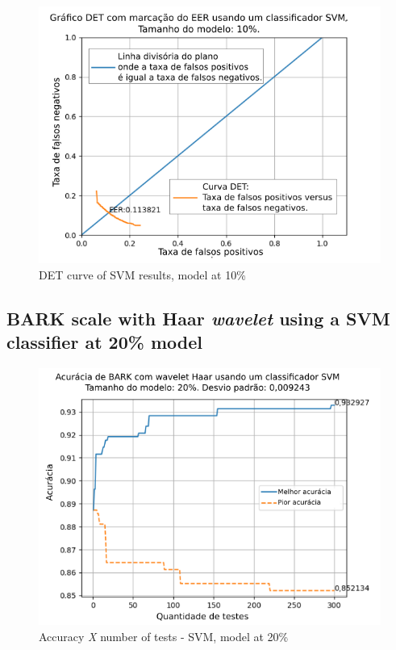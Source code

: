 \begin{figure}[H]
	\centering
	\includegraphics[width=.9\linewidth]{images/results/det/DET_SVM_10}
	\caption{DET curve of SVM results, model at 10\%}
	\label{fig:detsvm10}
\end{figure}

\subsection{BARK scale with Haar \textit{wavelet} using a SVM classifier at 20\% model}



\begin{figure}[h]
	\centering
	\includegraphics[width=.95\linewidth]{images/results/confusionMatrices/classifier_SVM_20.png}
	\caption{Accuracy \textit{X} number of tests - SVM, model at 20\%}
	\label{fig:classifiersvm20}
\end{figure}

